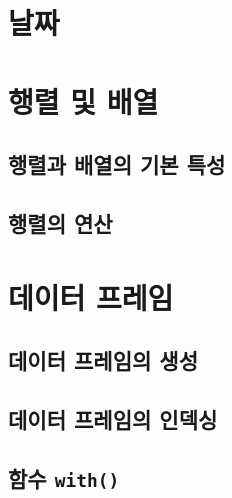 \documentclass[
]{book}
\begin{document}
\hypertarget{uxb0a0uxc9dc}{%
\section{날짜}\label{uxb0a0uxc9dc}}

\hypertarget{uxd589uxb82c-uxbc0f-uxbc30uxc5f4}{%
\section{행렬 및 배열}\label{uxd589uxb82c-uxbc0f-uxbc30uxc5f4}}

\hypertarget{uxd589uxb82cuxacfc-uxbc30uxc5f4uxc758-uxae30uxbcf8-uxd2b9uxc131}{%
\subsection{행렬과 배열의 기본 특성}\label{uxd589uxb82cuxacfc-uxbc30uxc5f4uxc758-uxae30uxbcf8-uxd2b9uxc131}}

\hypertarget{uxd589uxb82cuxc758-uxc5f0uxc0b0}{%
\subsection{행렬의 연산}\label{uxd589uxb82cuxc758-uxc5f0uxc0b0}}

\hypertarget{uxb370uxc774uxd130-uxd504uxb808uxc784}{%
\section{데이터 프레임}\label{uxb370uxc774uxd130-uxd504uxb808uxc784}}

\hypertarget{uxb370uxc774uxd130-uxd504uxb808uxc784uxc758-uxc0dduxc131}{%
\subsection{데이터 프레임의 생성}\label{uxb370uxc774uxd130-uxd504uxb808uxc784uxc758-uxc0dduxc131}}

\hypertarget{uxb370uxc774uxd130-uxd504uxb808uxc784uxc758-uxc778uxb371uxc2f1}{%
\subsection{데이터 프레임의 인덱싱}\label{uxb370uxc774uxd130-uxd504uxb808uxc784uxc758-uxc778uxb371uxc2f1}}

\hypertarget{uxd568uxc218-with}{%
\subsection{\texorpdfstring{함수 \texttt{with()}}{함수 with()}}\label{uxd568uxc218-with}}
\end{document}
